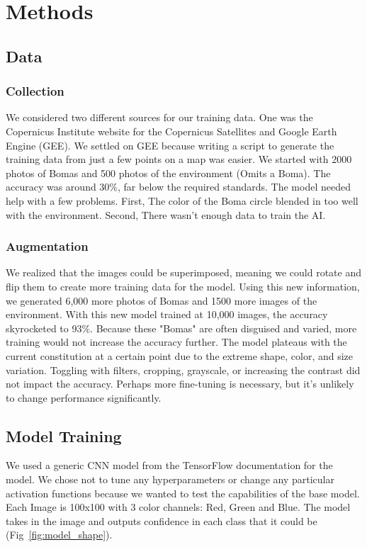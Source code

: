 \documentclass[10pt]{article}
\begin{document}
\section{Methods}
\label{methods}


\subsection{Data}

\subsubsection{Collection}

We considered two different sources for our training data. One was the Copernicus Institute website for the Copernicus Satellites and Google Earth Engine (GEE). We settled on GEE because writing a script to generate the training data from just a few points on a map was easier. We started with 2000 photos of Bomas and 500 photos of the environment (Omits a Boma). The accuracy was around 30\%, far below the required standards. The model needed help with a few problems. First, The color of the Boma circle blended in too well with the environment. Second, There wasn’t enough data to train the AI.


\subsubsection{Augmentation}

We realized that the images could be superimposed, meaning we could rotate and flip them to create more training data for the model. Using this new information, we generated 6,000 more photos of Bomas and 1500 more images of the environment. With this new model trained at 10,000 images, the accuracy skyrocketed to 93\%. Because these "Bomas" are often disguised and varied, more training would not increase the accuracy further. The model plateaus with the current constitution at a certain point due to the extreme shape, color, and size variation. Toggling with filters, cropping, grayscale, or increasing the contrast did not impact the accuracy. Perhaps more fine-tuning is necessary, but it's unlikely to change performance significantly.

\subsection{Model Training}
\label{training}

We used a generic CNN model from the TensorFlow documentation for the model. We chose not to tune any hyperparameters or change any particular activation functions because we wanted to test the capabilities of the base model. Each Image is 100x100 with 3 color channels: Red, Green and Blue. The model takes in the image and outputs confidence in each class that it could be (Fig~\ref{fig:model_shape}).
\end{document}
